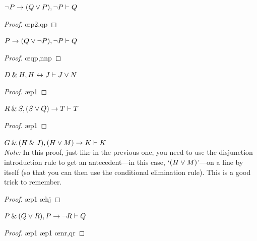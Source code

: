 \problempart
\begin{earg}
\item ${\neg} P \rightarrow (Q \vee P), {\neg} P \vdash Q$
\begin{proof}
	 \pr{}
	 \pr{}
	 
	 \oe{p2,qp}
\end{proof}
\medskip

\item $P \rightarrow (Q \vee {\neg} P), {\neg} P \vdash Q$\\
\begin{proof}
	 \pr{}
	 \pr{}
	 
	  
	 \oe{qp,nnp}
\end{proof}
\medskip


\item $D \mathbin{\&} H, H \leftrightarrow J  \vdash J \vee N$ 
\begin{proof}
	 \pr{}
	 \pr{}
	 \ae{p1}
	 
	 
\end{proof}
\medskip

\filbreak

\item $R \mathbin{\&} S, (S \vee Q) \rightarrow T \vdash T$
\begin{proof}
	 \pr{}
	 \pr{}
	 \ae{p1}
	 
	 
\end{proof}
\medskip

\item $G \mathbin{\&} (H \mathbin{\&} J), (H \vee M) \rightarrow K \vdash K$\\
\textit{Note:} In this proof, just like in the previous one, you need to use the disjunction introduction rule to get an antecedent---in this case, `$(H \vee M)$'---on a line by itself (so that you can then use the conditional elimination rule). This is a good trick to remember. 
\begin{proof}
	 \pr{}
	 \pr{}
	 \ae{p1}
	 \ae{hj}
	 
	 
\end{proof}
\medskip


\item $P \mathbin{\&} (Q \vee R), P \rightarrow {\neg} R \vdash Q$
\begin{proof}
	 \pr{}
	 \pr{}
	 \ae{p1}
	 
	 \ae{p1}
	 \oe{nr,qr}
\end{proof}
\medskip



\end{earg}
